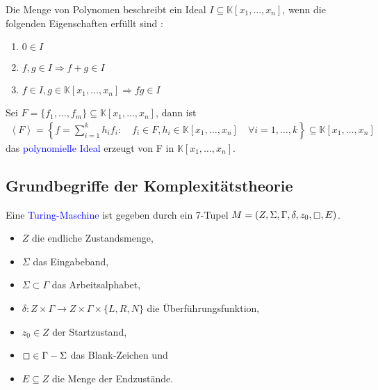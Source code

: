 \begin{definition}
Die Menge von Polynomen beschreibt ein Ideal $I \subseteq \mathbb{K}[x_1,\ldots,x_n]$, wenn die folgenden Eigenschaften erfüllt sind \cite{Ausgangsartikel}:
\begin{enumerate}
\item $0 \in I$
\item $f,g \in I \Rightarrow f+g \in I$
\item $f \in I, g \in \mathbb{K}[x_1,\ldots,x_n] \Rightarrow fg \in I$
\end{enumerate}
Sei $F = \{f_1,\ldots,f_m\} \subseteq \mathbb{K}[x_1,\ldots,x_n]$, dann ist
\begin{align*}
\left\langle F \right\rangle = \left\{f = \sum_{i=1}^k h_if_i: \quad f_i \in F, h_i \in \mathbb{K}[x_1,\ldots,x_n] \quad \forall i = 1,\ldots,k\right\} \subseteq \mathbb{K}[x_1,\ldots,x_n]
\end{align*}
das \textcolor{blue}{polynomielle Ideal} erzeugt von F in $\mathbb{K}[x_1,\ldots,x_n]$.
\end{definition}


\subsection{Grundbegriffe der Komplexitätstheorie}

\begin{definition}
Eine \textcolor{blue}{Turing-Maschine} ist gegeben durch ein 7-Tupel $M =(Z,\Sigma,\Gamma,\delta,z_0,\boxempty,E)$. \cite{Kompl1}
\begin{itemize}
\item $Z$ die endliche Zustandsmenge,
\item $\Sigma$ das Eingabeband,
\item $\Sigma \subset \Gamma$ das Arbeitsalphabet,
\item $\delta: Z \times \Gamma \rightarrow Z \times \Gamma \times \{L,R,N\}$ die Überführungsfunktion,
\item $z_0 \in Z$ der Startzustand,
\item $\boxempty \in \Gamma - \Sigma$ das Blank-Zeichen und 
\item $E \subseteq Z$ die Menge der Endzustände.
\end{itemize}
\end{definition}

